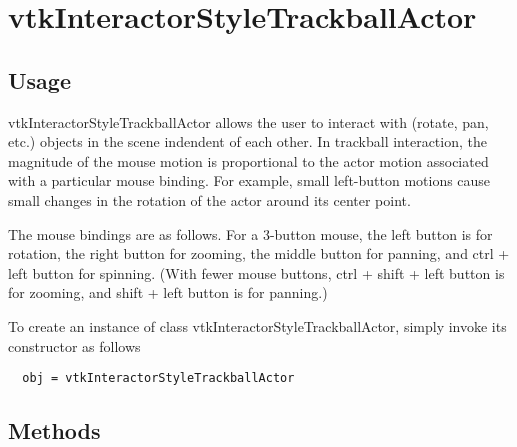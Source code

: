 \section{vtkInteractorStyleTrackballActor}

\subsection{Usage}

 vtkInteractorStyleTrackballActor allows the user to interact with (rotate,
 pan, etc.) objects in the scene indendent of each other.  In trackball
 interaction, the magnitude of the mouse motion is proportional to the
 actor motion associated with a particular mouse binding. For example,
 small left-button motions cause small changes in the rotation of the
 actor around its center point.

 The mouse bindings are as follows. For a 3-button mouse, the left button
 is for rotation, the right button for zooming, the middle button for
 panning, and ctrl + left button for spinning.  (With fewer mouse buttons,
 ctrl + shift + left button is for zooming, and shift + left button is for
 panning.)

To create an instance of class vtkInteractorStyleTrackballActor, simply
invoke its constructor as follows
\begin{verbatim}
  obj = vtkInteractorStyleTrackballActor
\end{verbatim}
\subsection{Methods}

